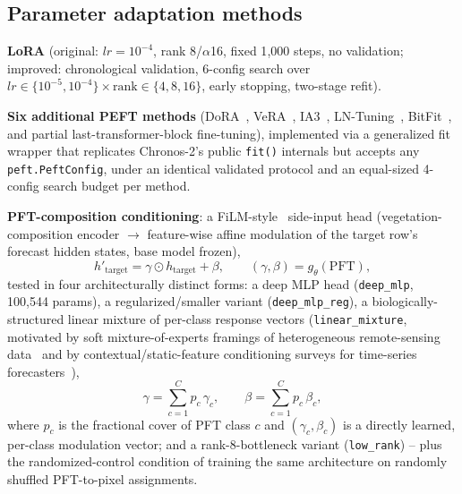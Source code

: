 \documentclass[11pt]{article}
\begin{document}
\subsection{Parameter adaptation methods}
\label{sec:methods-adaptation}

\textbf{LoRA} \citep{hu2022lora} (original: $\mathit{lr}=10^{-4}$, rank 8/$\alpha$16, fixed 1{,}000
steps, no validation; improved: chronological validation, 6-config search over
$\mathit{lr}\in\{10^{-5},10^{-4}\}\times\mathrm{rank}\in\{4,8,16\}$, early stopping, two-stage
refit).

\textbf{Six additional PEFT methods} (DoRA~\citep{liu2024dora}, VeRA~\citep{kopiczko2024vera},
IA3~\citep{liu2022ia3}, LN-Tuning~\citep{arxiv2409.11302}, BitFit~\citep{zaken2022bitfit}, and
partial last-transformer-block fine-tuning), implemented via a generalized fit wrapper that
replicates Chronos-2's public \texttt{fit()} internals but accepts any \texttt{peft.PeftConfig},
under an identical validated protocol and an equal-sized 4-config search budget per method.

\textbf{PFT-composition conditioning}: a FiLM-style~\citep{perez2018film} side-input head
(vegetation-composition encoder $\rightarrow$ feature-wise affine modulation of the target row's
forecast hidden states, base model frozen),
\begin{equation}
  h'_{\text{target}} = \gamma \odot h_{\text{target}} + \beta, \qquad (\gamma, \beta) = g_\theta(\mathrm{PFT}),
  \label{eq:film}
\end{equation}
tested in four architecturally distinct forms: a deep MLP head (\texttt{deep\_mlp},
100{,}544 params), a regularized/smaller variant (\texttt{deep\_mlp\_reg}), a
biologically-structured linear mixture of per-class response vectors
(\texttt{linear\_mixture}, motivated by soft mixture-of-experts framings of heterogeneous
remote-sensing data~\citep{stf_moe_pmc12318938} and by contextual/static-feature conditioning
surveys for time-series forecasters~\citep{arxiv2410.12672}),
\begin{equation}
  \gamma = \sum_{c=1}^{C} p_c\, \gamma_c, \qquad \beta = \sum_{c=1}^{C} p_c\, \beta_c,
  \label{eq:linear-mixture}
\end{equation}
where $p_c$ is the fractional cover of PFT class $c$ and $(\gamma_c, \beta_c)$ is a directly
learned, per-class modulation vector; and a rank-8-bottleneck variant (\texttt{low\_rank}) --
plus the randomized-control condition of training the same architecture on randomly shuffled
PFT-to-pixel assignments.
\end{document}
